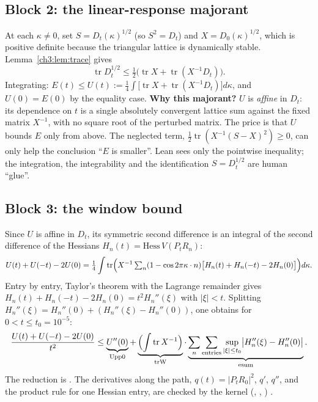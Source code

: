\subsection{Block 2: the linear-response majorant \tierC}\label{ch3:sec:majorant}
At each $\kappa\ne0$, set $S=D_t(\kappa)^{1/2}$ (so $S^2=D_t$) and $X=D_0(\kappa)^{1/2}$, which is positive definite
because the triangular lattice is dynamically stable. Lemma~\ref{ch3:lem:trace} gives
\[
\operatorname{tr}D_t^{1/2}\le\tfrac12\bigl(\operatorname{tr}X+\operatorname{tr}(X^{-1}D_t)\bigr).
\]
Integrating: $E(t)\le U(t):=\tfrac14\int\bigl[\operatorname{tr}X+\operatorname{tr}(X^{-1}D_t)\bigr]d\kappa$, and
$U(0)=E(0)$ by the equality case. \textbf{Why this majorant?} $U$ is \emph{affine} in $D_t$: its dependence on $t$
is a single absolutely convergent lattice sum against the fixed matrix $X^{-1}$, with no square root of the
perturbed matrix. The price is that $U$ bounds $E$ only from above. The neglected term,
$\tfrac12\operatorname{tr}(X^{-1}(S-X)^2)\ge0$, can only help the conclusion ``$E$ is smaller''. Lean sees only
the pointwise inequality; the integration, the integrability and the identification $S=D_t^{1/2}$ are human ``glue''.

\subsection{Block 3: the window bound}\label{ch3:sec:fenetre}
Since $U$ is affine in $D_t$, its symmetric second difference is an integral of the second difference of the Hessians
$H_n(t)=\mathrm{Hess}\,V(P_tR_n)$:
\[
U(t)+U(-t)-2U(0)=\tfrac14\int\operatorname{tr}\Bigl(X^{-1}\textstyle\sum_n(1-\cos2\pi\kappa\cdot n)\bigl[H_n(t)+H_n(-t)-2H_n(0)\bigr]\Bigr)d\kappa .
\]
Entry by entry, Taylor's theorem with the Lagrange remainder gives $H_n(t)+H_n(-t)-2H_n(0)=t^2H_n''(\xi)$ with
$|\xi|<t$. Splitting $H_n''(\xi)=H_n''(0)+(H_n''(\xi)-H_n''(0))$, one obtains for $0<t\le t_0=10^{-5}$:
\begin{equation}\label{ch3:eq:fenetre}
\frac{U(t)+U(-t)-2U(0)}{t^2}\le\underbrace{U''(0)}_{\mathrm{Upp0}}+\underbrace{\Bigl(\int\operatorname{tr}X^{-1}\Bigr)}_{\mathrm{trW}}\cdot
\underbrace{\sum_n\sum_{\text{entries}}\sup_{|\xi|\le t_0}\bigl|H_n''(\xi)-H_n''(0)\bigr|}_{\mathrm{esum}} .
\end{equation}
The reduction is \tierC. The derivatives along the path, $q(t)=|P_tR_0|^2$, $q'$, $q''$, and the product rule for
one Hessian entry, are checked by the kernel (, ,
) \tierAs.

